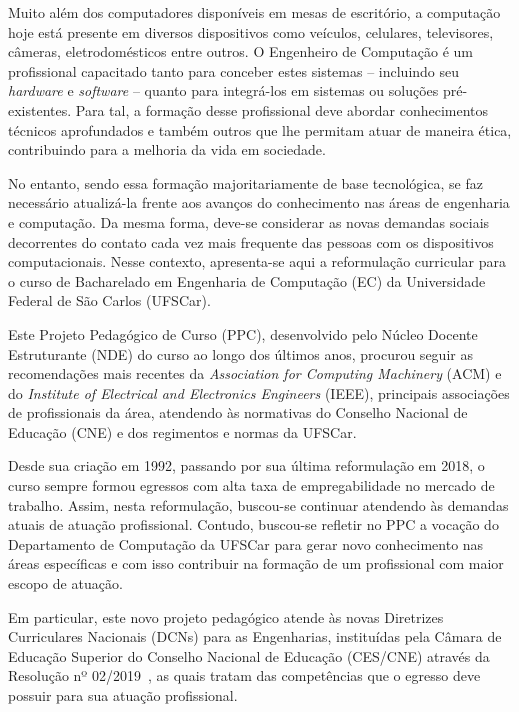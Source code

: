 

Muito além dos computadores disponíveis em mesas de escritório, a computação hoje está presente em diversos dispositivos como veículos, celulares, televisores, câmeras, eletrodomésticos entre outros. O Engenheiro de Computação é um profissional capacitado tanto para conceber estes sistemas -- incluindo seu \textit{hardware} e \textit{software} -- quanto para integrá-los em sistemas ou soluções pré-existentes. Para tal, a formação desse profissional deve abordar conhecimentos técnicos aprofundados e também outros que lhe permitam atuar de maneira ética, contribuindo para a melhoria da vida em sociedade.

No entanto, sendo essa formação majoritariamente de base tecnológica, se faz necessário atualizá-la frente aos avanços do conhecimento nas áreas de engenharia e computação. Da mesma forma, deve-se considerar as novas demandas sociais decorrentes do contato cada vez mais frequente das pessoas com os dispositivos computacionais. Nesse contexto, apresenta-se aqui a reformulação curricular para o curso de Bacharelado em Engenharia de Computação (EC) da Universidade Federal de São Carlos (UFSCar).

Este Projeto Pedagógico de Curso (PPC), desenvolvido pelo Núcleo Docente Estruturante (NDE) do curso ao longo dos últimos anos, procurou seguir as recomendações mais recentes da \textit{Association for Computing Machinery} (ACM) e do \textit{Institute of Electrical and Electronics Engineers} (IEEE), principais associações de profissionais da área, atendendo às normativas do Conselho Nacional de Educação (CNE) e dos regimentos e normas da UFSCar.

Desde sua criação em 1992, passando por sua última reformulação em 2018, o curso sempre formou egressos com alta taxa de empregabilidade no mercado de trabalho. Assim, nesta reformulação, buscou-se continuar atendendo às demandas atuais de atuação profissional. Contudo, buscou-se refletir no PPC a vocação do Departamento de Computação da UFSCar para gerar novo conhecimento nas áreas específicas e com isso contribuir na formação de um profissional com maior escopo de atuação.

Em particular, este novo projeto pedagógico atende às novas Diretrizes Curriculares Nacionais (DCNs) para as Engenharias, instituídas pela Câmara de Educação Superior do Conselho Nacional de Educação (CES/CNE) através da Resolução nº 02/2019~\cite{CNE2019}, as quais tratam das competências que o egresso deve possuir para sua atuação profissional.

